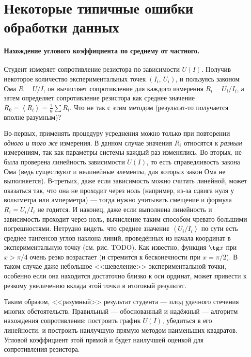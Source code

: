 \section{Некоторые типичные ошибки обработки данных}

\paragraph{Нахождение углового коэффициента по среднему от частного.}

Студент измеряет сопротивление резистора по зависимости $U\!\left(I\right)$.
Получив некоторое количество экспериментальных точек $\left(I_{i},\,U_{i}\right)$,
и пользуясь законом Ома $R=U/I$, он вычисляет сопротивление для каждого
измерения $R_{i}=U_{i}/I_{i}$, а затем определяет сопротивление резистора
как среднее значение $R_{0}=\left\langle R_{i}\right\rangle =\frac{1}{n}\sum R_{i}$.
Что не так с этим методом (результат-то получается вполне разумным)?

{\footnotesize
Во-первых, применять процедуру усреднения можно только
при повторении \emph{одного и того же} измерения. В данном случае значения $R_{i}$
относятся к \emph{разным} измерениям, так как параметры системы каждый раз изменялись.
Во-вторых, не была проверена линейность зависимости $U\left(I\right)$, то есть
справедливость закона Ома (ведь существуют и нелинейные элементы,
для которых закон Ома не выполняется). В-третьих, даже если зависимость
можно считать линейной, может оказаться так, что она не проходит через
ноль (например, из-за сдвига нуля у вольтметра или амперметра) ---
тогда нужно учитывать смещение и формула $R_{i}=U_{i}/I_{i}$ не годится.
И наконец, даже если выполнена линейность и зависимость проходит через
ноль, вычисление таким способом чревато большими погрешностями. Нетрудно
видеть, что среднее значение $\left\langle U_{i}/I_{i}\right\rangle $
по сути есть среднее тангенсов углов наклона линий, проведённых из
начала координат в экспериментальную точку (см. рис. TODO). Как известно,
функция $\tg x$ при $x>\pi/4$ очень резко возрастает (и стремится
к бесконечности при $x=\pi/2$). В таком случае даже небольшое <<шевеление>>
экспериментальной точки, особенно если она находится достаточно близко
к оси ординат, может привести к резкому увеличению вклада этой точки
в итоговый результат.

Таким образом, <<разумный>> результат студента --- плод удачного стечения многих
обстоятельств. Правильный --- обоснованный и надёжный --- алгоритм
нахождения сопротивления: построить график $U\left(I\right)$, убедиться
в его линейности, и построить наилучшую прямую методом наименьших
квадратов. Угловой коэффициент этой прямой и будет наилучшей оценкой
для сопротивления резистора.\par
}%

